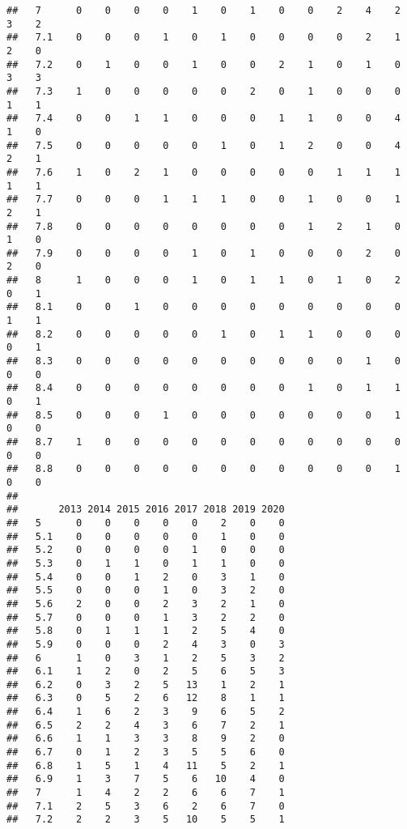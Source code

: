 \documentclass[
]{article}
\begin{document}
\begin{verbatim}
##   7      0    0    0    0    1    0    1    0    0    2    4    2    3    2
##   7.1    0    0    0    1    0    1    0    0    0    0    2    1    2    0
##   7.2    0    1    0    0    1    0    0    2    1    0    1    0    3    3
##   7.3    1    0    0    0    0    0    2    0    1    0    0    0    1    1
##   7.4    0    0    1    1    0    0    0    1    1    0    0    4    1    0
##   7.5    0    0    0    0    0    1    0    1    2    0    0    4    2    1
##   7.6    1    0    2    1    0    0    0    0    0    1    1    1    1    1
##   7.7    0    0    0    1    1    1    0    0    1    0    0    1    2    1
##   7.8    0    0    0    0    0    0    0    0    1    2    1    0    1    0
##   7.9    0    0    0    0    1    0    1    0    0    0    2    0    2    0
##   8      1    0    0    0    1    0    1    1    0    1    0    2    0    1
##   8.1    0    0    1    0    0    0    0    0    0    0    0    0    1    1
##   8.2    0    0    0    0    0    1    0    1    1    0    0    0    0    1
##   8.3    0    0    0    0    0    0    0    0    0    0    1    0    0    0
##   8.4    0    0    0    0    0    0    0    0    1    0    1    1    0    1
##   8.5    0    0    0    1    0    0    0    0    0    0    0    1    0    0
##   8.7    1    0    0    0    0    0    0    0    0    0    0    0    0    0
##   8.8    0    0    0    0    0    0    0    0    0    0    0    1    0    0
##      
##       2013 2014 2015 2016 2017 2018 2019 2020
##   5      0    0    0    0    0    2    0    0
##   5.1    0    0    0    0    0    1    0    0
##   5.2    0    0    0    0    1    0    0    0
##   5.3    0    1    1    0    1    1    0    0
##   5.4    0    0    1    2    0    3    1    0
##   5.5    0    0    0    1    0    3    2    0
##   5.6    2    0    0    2    3    2    1    0
##   5.7    0    0    0    1    3    2    2    0
##   5.8    0    1    1    1    2    5    4    0
##   5.9    0    0    0    2    4    3    0    3
##   6      1    0    3    1    2    5    3    2
##   6.1    1    2    0    2    5    6    5    3
##   6.2    0    3    2    5   13    1    2    1
##   6.3    0    5    2    6   12    8    1    1
##   6.4    1    6    2    3    9    6    5    2
##   6.5    2    2    4    3    6    7    2    1
##   6.6    1    1    3    3    8    9    2    0
##   6.7    0    1    2    3    5    5    6    0
##   6.8    1    5    1    4   11    5    2    1
##   6.9    1    3    7    5    6   10    4    0
##   7      1    4    2    2    6    6    7    1
##   7.1    2    5    3    6    2    6    7    0
##   7.2    2    2    3    5   10    5    5    1

\end{verbatim}
\end{document}
